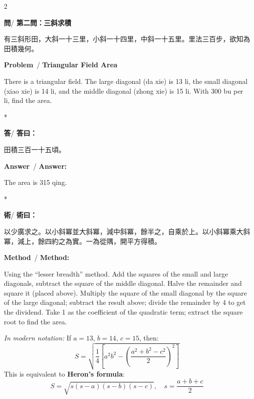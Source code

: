 \documentclass[11pt,a4paper]{article}
\newcommand{\wen}{\textbf{\color{sectioncolor}問}}
\newcommand{\da}{\textbf{\color{answercolor}答}}
\newcommand{\shu}{\textbf{\color{methodcolor}術}}
\newcommand{\prb}{\textbf{\color{sectioncolor}Problem}}
\newcommand{\ans}{\textbf{\color{answercolor}Answer}}
\newcommand{\meth}{\textbf{\color{methodcolor}Method}}
\begin{document}
\begin{paracol}{2}

\begin{leftcolumn*}
\wen / \textbf{第二問：三斜求積}

有三斜形田，大斜一十三里，小斜一十四里，中斜一十五里。里法三百步，欲知為田積幾何。
\end{leftcolumn*}

\begin{rightcolumn}
\prb\ / \textbf{Triangular Field Area}

There is a triangular field. The large diagonal 
(da xie) is 13 li, the small diagonal (xiao xie) is 14 li, and the middle 
diagonal (zhong xie) is 15 li. With 300 bu per li, find the area.
\end{rightcolumn}

\switchcolumn[0]*

\begin{leftcolumn*}
\da / \textbf{答曰：}

田積三百一十五頃。
\end{leftcolumn*}

\begin{rightcolumn}
\ans\ / \textbf{Answer:}

The area is 315 qing.
\end{rightcolumn}

\switchcolumn[0]*

\begin{leftcolumn*}
\shu / \textbf{術曰：}

以少廣求之。以小斜冪並大斜冪，減中斜冪，餘半之，自乘於上。以小斜冪乘大斜冪，減上，餘四約之為實。一為從隅，開平方得積。
\end{leftcolumn*}

\begin{rightcolumn}
\meth\ / \textbf{Method:}

Using the ``lesser breadth'' method. Add the squares of 
the small and large diagonals, subtract the square of the middle diagonal. 
Halve the remainder and square it (placed above). Multiply the square of 
the small diagonal by the square of the large diagonal; subtract the result 
above; divide the remainder by 4 to get the dividend. Take 1 as the 
coefficient of the quadratic term; extract the square root to find the area.

\medskip
\textit{In modern notation:} If $a=13$, $b=14$, $c=15$, then:
\[
S = \sqrt{\frac{1}{4}\left[a^2b^2 - \left(\frac{a^2+b^2-c^2}{2}\right)^2\right]}
\]
This is equivalent to \textbf{Heron's formula}:
\[
S = \sqrt{s(s-a)(s-b)(s-c)}, \quad s = \frac{a+b+c}{2}
\]
\end{rightcolumn}

\end{paracol}
\end{document}
